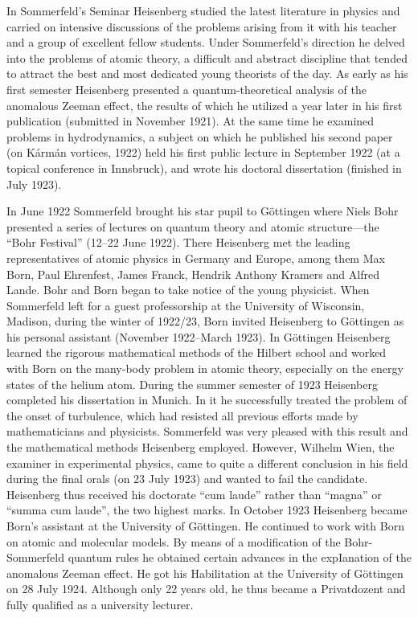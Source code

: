 \documentclass{article}
\begin{document}
In Sommerfeld's Seminar Heisenberg studied the latest literature in physics and carried on intensive discussions of the problems arising from it with his teacher and a group of excellent fellow students. Under Sommerfeld's direction he delved into the problems of atomic theory, a difficult and abstract discipline that tended to attract the best and most dedicated young theorists of the day. As early as his first semester Heisenberg presented a quantum-theoretical analysis of the anomalous Zeeman effect, the results of which he utilized a year later in his first publication (submitted in November 1921). At the same time he examined problems in hydrodynamics, a subject on which he published his second paper (on Kármán vortices, 1922) held his first public lecture in September 1922 (at a topical conference in Innsbruck), and wrote his doctoral dissertation (finished in July 1923).

In June 1922 Sommerfeld brought his star pupil to Göttingen where Niels Bohr presented a series of lectures on quantum theory and atomic structure---the “Bohr Festival” (12--22 June 1922). There Heisenberg met the leading representatives of atomic physics in Germany and Europe, among them Max Born, Paul Ehrenfest, James Franck, Hendrik Anthony Kramers and Alfred Lande. Bohr and Born began to take notice of the young physicist. When Sommerfeld left for a guest professorship at the University of Wisconsin, Madison, during the winter of 1922/23, Born invited Heisenberg to Göttingen as his personal assistant (November 1922--March 1923). In Göttingen Heisenberg learned the rigorous mathematical methods of the Hilbert school and worked with Born on the many-body problem in atomic theory, especially on the energy states of the helium atom.
During the summer semester of 1923 Heisenberg completed his dissertation in Munich. In it he successfully treated the problem of the onset of turbulence, which had resisted all previous efforts made by mathematicians and physicists. Sommerfeld was very pleased with this result and the mathematical methods Heisenberg employed. However, Wilhelm Wien, the examiner in experimental physics, came to quite a different conclusion in his field during the final orals (on 23 July 1923) and wanted to fail the candidate. Heisenberg thus received his doctorate “cum laude” rather than “magna” or “summa cum laude”, the two highest marks. In October 1923 Heisenberg became Born's assistant at the University of Göttingen. He continued to work with Born on atomic and molecular models. By means of a modification of the Bohr-Sommerfeld quantum rules he obtained certain advances in the expIanation of the anomalous Zeeman effect. He got his Habilitation at the University of Göttingen on 28 July 1924. Although only 22 years old, he thus became a Privatdozent and fully qualified as a university lecturer.
\end{document}
